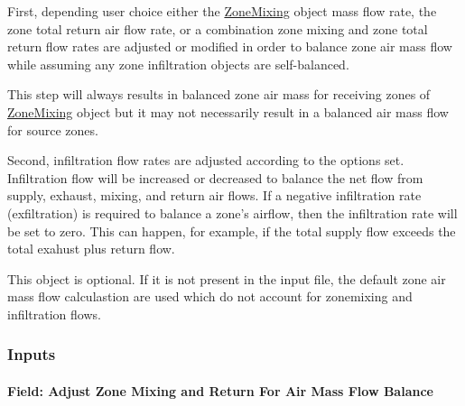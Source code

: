 First, depending user choice either the \hyperref[zonemixing]{ZoneMixing} object mass flow rate, the zone total return air flow rate, or a combination zone mixing and zone total return flow rates are adjusted or modified in order to balance zone air mass flow while assuming any zone infiltration objects are self-balanced. 

This step will always results in balanced zone air mass for receiving zones of \hyperref[zonemixing]{ZoneMixing} object but it may not necessarily result in a balanced air mass flow for source zones.~

Second, infiltration flow rates are adjusted according to the options set. Infiltration flow will be increased or decreased to balance the net flow from supply, exhaust, mixing, and return air flows. If a negative infiltration rate (exfiltration) is required to balance a zone's airflow, then the infiltration rate will be set to zero. This can happen, for example, if the total supply flow exceeds the total exahust plus return flow.

This object is optional. If it is not present in the input file, the default zone air mass flow calculastion are used which do not account for zonemixing and infiltration flows.

\subsubsection{Inputs}\label{inputs-9-002}

\paragraph{Field: Adjust Zone Mixing and Return For Air Mass Flow Balance}\label{field-adjust-zone-mixing-and-return-for-air-mass-flow-balance}

